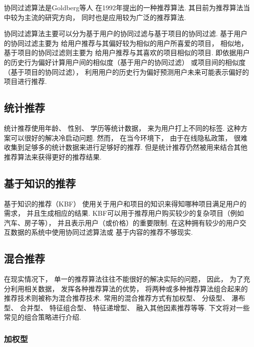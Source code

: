 协同过滤算法是Goldberg等人\cite{goldbergUsingCollaborativeFiltering1992}
在1992年提出的一种推荐算法.
其目前为推荐算法当中较为主流的研究方向，
同时也是应用较为广泛的推荐算法.

协同过滤算法主要可以分为基于用户的协同过滤与基于项目的协同过滤.
基于用户的协同过滤主要为
给用户推荐与其偏好较为相似的用户所喜爱的项目，
相似地，
基于项目的协同过滤则主要为
给用户推荐与其喜欢的项目相似的项目.
即依据用户的历史行为偏好计算用户间的相似度（基于用户的协同过滤）
或项目间的相似度（基于项目的协同过滤），
利用用户的历史行为偏好预测用户未来可能表示偏好的项目进行推荐.

\subsection{统计推荐}

统计推荐使用年龄、
性别、
学历等统计数据，
来为用户打上不同的标签.
这种方案可以很好的解决冷启动问题.
然而，
在当今环境下，
由于在线隐私政策，
很难收集到足够多的统计数据来进行足够好的推荐.
但是统计推荐仍然被用来结合其他推荐算法来获得更好的推荐结果.

\subsection{基于知识的推荐}

基于知识的推荐（KBF）
使用关于用户和项目的知识来得知哪种项目满足用户的需求，
并且生成相应的结果\cite{burkeKnowledgeBasedRecommenderSystems2000}.
KBF可以用于推荐用户购买较少的复杂项目（例如汽车、房子等），
并且表示用户（或价格）的重要限制\cite{felfernigConstraintbasedRecommenderSystems2008}.
在这种拥有较少的用户交互数据的系统中使用协同过滤算法或
基于内容的推荐不够现实.

\subsection{混合推荐}

在现实情况下，
单一的推荐算法往往不能很好的解决实际的问题，
因此，
为了充分利用相关数据，
发挥各种推荐算法的优势，
将两种或多种推荐算法组合起来的推荐技术则被称为混合推荐技术.
常用的混合推荐方式有加权型、
分级型、
瀑布型、
合并型、
特征组合型、
特征递增型、
融入其他因素推荐等等.
下文将对一些常见的组合策略进行介绍\cite{heJiYuJuanJiShenJingWangLuoDeYinLeTuiJianXiTong2019}.

\subsubsection{加权型}

